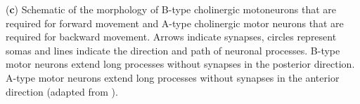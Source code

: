 \begin{FPfigure}
{(\textbf{c}) Schematic of the morphology of B-type cholinergic motoneurons that are required for forward movement 
and A-type cholinergic motor neurons that are required for backward movement. Arrows indicate synapses, 
circles represent somas and lines indicate the direction and path of neuronal processes. B-type motor neurons 
extend long processes without synapses in the posterior direction. A-type motor neurons extend long processes 
without synapses in the anterior direction (adapted from \citep{chen_neuronal_2007}). 
\label{fig:prop_sup1}}
\end{FPfigure}

